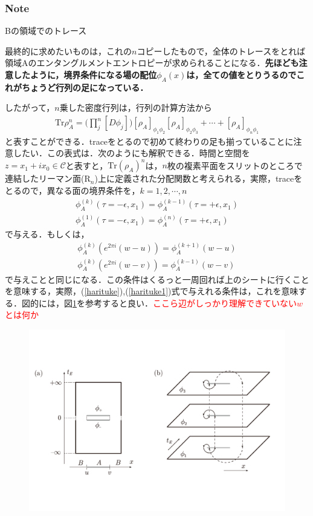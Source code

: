 \subsubsection{Note}

\hrulefill

Bの領域でのトレース

\hrulefill
最終的に求めたいものは，これの$n$コピーしたもので，全体のトレースをとれば領域Aのエンタングルメントエントロピーが求められることになる．\textbf{先ほども注意したように，境界条件になる場の配位$\phi_{A}(x)$は，全ての値をとりうるのでこれがちょうど行列の足になっている．}

したがって，$n$乗した密度行列は，行列の計算方法から
\begin{align}
  \mathrm{Tr}\rho_{A}^{n}=\biggl(\prod^{n}_{j}[D\phi_{j}]\biggr)[\rho_{A}]_{\phi_1\phi_2}[\rho_{A}]_{\phi_2\phi_3}+\cdots+[\rho_{A}]_{\phi_n\phi_1}
\end{align}
と表すことができる．traceをとるので初めて終わりの足も揃っていることに注意したい．この表式は．次のようにも解釈できる．時間と空間を$z=x_1+ix_0 \in \mathcal{C}$と表すと，$\mathrm{Tr}(\rho_A)^n$は，$n$枚の複素平面をスリットのところで連結したリーマン面($\mathrm{R}_n$)上に定義された分配関数と考えられる，実際，traceをとるので，異なる面の境界条件を，$k=1,2,\cdots,n$
\begin{align}
  \label{harituke}
  \phi_{A}^{(k)}(\tau=-\epsilon,x_1)=\phi_{A}^{(k-1)}(\tau=+\epsilon,x_1)\\
  \label{harituke1}
  \phi_{A}^{(1)}(\tau=-\epsilon,x_1)=\phi_{A}^{(n)}(\tau=+\epsilon,x_1)
\end{align}
で与える．もしくは，
\begin{align}
  \phi_{A}^{(k)}(e^{2\pi i}(w-u))=\phi_{A}^{(k+1)}(w-u)\\
  \phi_{A}^{(k)}(e^{2\pi i}(w-v))=\phi_{A}^{(k-1)}(w-v)
\end{align}
で与えことと同じになる．この条件はくるっと一周回れば上のシートに行くことを意味する，実際，(\ref{harituke}),(\ref{harituke1})式で与えれる条件は，これを意味する．図的には，図\ref{replica00}を参考すると良い．\textcolor{red}{ここら辺がしっかり理解できていない$w$とは何か}
\begin{figure}[H]
\begin{center}
  \includegraphics[width=12cm,angle=0]{replica.pdf}
  　　　\caption{}
  　　\label{replica00}
\end{center}
\end{figure}

